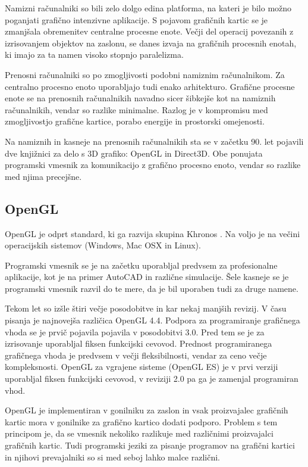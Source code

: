 Namizni računalniki so bili zelo dolgo edina platforma, na kateri je bilo možno poganjati grafično intenzivne aplikacije. S pojavom grafičnih kartic se je zmanjšala obremenitev centralne procesne enote. Večji del operacij povezanih z izrisovanjem objektov na zaslonu, se danes izvaja na grafičnih procesnih enotah, ki imajo za ta namen visoko stopnjo paralelizma. 

Prenosni računalniki so po zmogljivosti podobni namiznim računalnikom. Za centralno procesno enoto uporabljajo tudi enako arhitekturo. Grafične procesne enote se na prenosnih računalnikih navadno sicer šibkejše kot na namiznih računalnikih, vendar so razlike minimalne. Razlog je v kompromisu med zmogljivostjo grafične kartice, porabo energije in prostorski omejenosti.

Na namiznih in kasneje na prenosnih računalnikih sta se v začetku 90. let pojavili dve knjižnici za delo s 3D grafiko: OpenGL in Direct3D. Obe ponujata programski vmesnik za komunikacijo z grafično procesno enoto, vendar so razlike med njima precejšne.


\subsection{OpenGL}

OpenGL je odprt standard, ki ga razvija skupina Khronos \cite{opengl}. Na voljo je na večini operacijskih sistemov (Windows, Mac OSX in Linux).

Programski vmesnik se je na začetku uporabljal predvsem za profesionalne aplikacije, kot je na primer AutoCAD in različne simulacije. Šele kasneje se je programski vmesnik razvil do te mere, da je bil uporaben tudi za druge namene.

Tekom let so izšle štiri večje posodobitve in kar nekaj manjših revizij. V času pisanja je najnovejša različica OpenGL 4.4. Podpora za programiranje grafičnega vhoda se je prvič pojavila pojavila v posodobitvi 3.0. Pred tem se je za izrisovanje uporabljal fiksen funkcijski cevovod. Prednost programiranega grafičnega vhoda je predvsem v večji fleksibilnosti, vendar za ceno večje kompleksnosti. OpenGL za vgrajene sisteme (OpenGL ES) je v prvi verziji uporabljal fiksen funkcijski cevovod, v reviziji 2.0 pa ga je zamenjal programiran vhod. 

OpenGL je implementiran v gonilniku za zaslon in vsak proizvajalec grafičnih kartic mora v gonilnike za grafično kartico dodati podporo. Problem s tem principom je, da se vmesnik nekoliko razlikuje med različnimi proizvajalci grafičnih kartic. Tudi programski jeziki za pisanje programov na grafični kartici in njihovi prevajalniki so si med seboj lahko malce različni.

